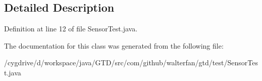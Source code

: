 \subsection{Detailed Description}


Definition at line 12 of file Sensor\-Test.\-java.



The documentation for this class was generated from the following file\-:\begin{DoxyCompactItemize}
\item 
/cygdrive/d/workspace/java/\-G\-T\-D/src/com/github/walterfan/gtd/test/Sensor\-Test.\-java\end{DoxyCompactItemize}
